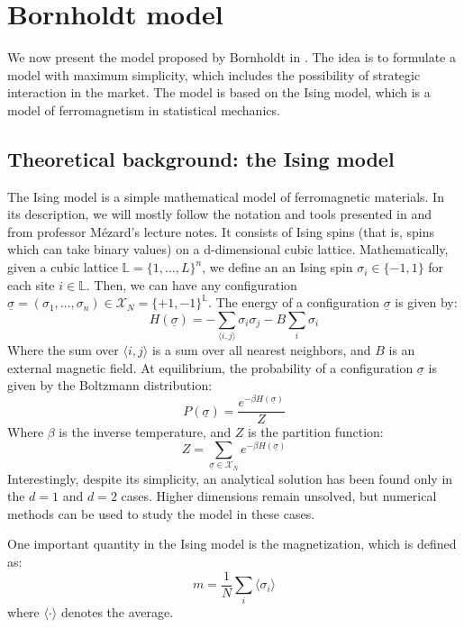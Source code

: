 \chapter{Bornholdt model}\label{ch:chapter2}
We now present the model proposed by Bornholdt in \cite{bornholdt}. The idea is to formulate a model with maximum simplicity, which includes the possibility of strategic interaction in the market. The model is based on the Ising model, which is a model of ferromagnetism in statistical mechanics.

\section{Theoretical background: the Ising model}
The Ising model is a simple mathematical model of ferromagnetic materials. In its description, we will mostly follow the notation and tools presented in \cite{mezard_book} and from professor Mézard's lecture notes. It consists of Ising spins (that is, spins which can take binary values) on a d-dimensional cubic lattice. Mathematically, given a cubic lattice $\mathbb{L}=\{1,\dots,L\}^n$, we define an an Ising spin $\sigma_i\in\{-1,1\}$ for each site $i\in\mathbb{L}$. Then, we can have any configuration $\underline{\sigma} = (\sigma_1,\dots,\sigma_n) \in \mathcal{X}_N=\{+1,-1\}^{\mathbb{L}}$. The energy of a configuration $\underline{\sigma}$ is given by:
\begin{equation}
    H(\underline{\sigma}) = -\sum_{\langle i,j\rangle}\sigma_i\sigma_j - B\sum_i \sigma_i
\end{equation}
Where the sum over $\langle i,j\rangle$ is a sum over all nearest neighbors, and $B$ is an external magnetic field. At equilibrium, the probability of a configuration $\underline{\sigma}$ is given by the Boltzmann distribution:
\begin{equation}
    P(\underline{\sigma}) = \frac{e^{-\beta H(\underline{\sigma})}}{Z}
\end{equation}
Where $\beta$ is the inverse temperature, and $Z$ is the partition function:
\begin{equation}
    Z = \sum_{\underline{\sigma}\in\mathcal{X}_N}e^{-\beta H(\underline{\sigma})}
\end{equation}
Interestingly, despite its simplicity, an analytical solution has been found only in the $d=1$ and $d=2$ cases. Higher dimensions remain unsolved, but numerical methods can be used to study the model in these cases.

One important quantity in the Ising model is the magnetization, which is defined as:
\begin{equation}
    m = \frac{1}{N}\sum_i \langle \sigma_i \rangle
\end{equation}
where $\langle \cdot \rangle$ denotes the average.


